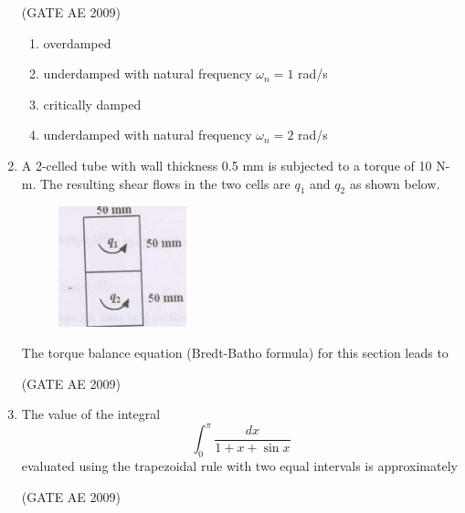 \documentclass[journal,12pt,onecolumn]{IEEEtran}
\theoremstyle{remark}
\begin{document}
\begin{flushleft}
\begin{enumerate}
\hfill(GATE AE 2009)

\begin{enumerate}
\item overdamped
\item underdamped with natural frequency $\omega_n = 1$ rad/s
\item critically damped
\item underdamped with natural frequency $\omega_n = 2$ rad/s
\end{enumerate}

\item A 2-celled tube with wall thickness 0.5 mm is subjected to a torque of 10 N-m. The resulting shear flows in the two cells are $q_1$ and $q_2$ as shown below.

\begin{figure}[H]
    \centering
    \includegraphics[width=0.35\columnwidth]{figs/44.png}
    \caption{}
    \label{fig:placeholder}
\end{figure}

The torque balance equation (Bredt-Batho formula) for this section leads to

\hfill(GATE AE 2009)

\begin{enumerate}

\end{enumerate}

\item The value of the integral
\[
\int_0^\pi \frac{dx}{1 + x + \sin x}
\]
evaluated using the trapezoidal rule with two equal intervals is approximately

\hfill(GATE AE 2009)

\begin{enumerate}


\end{enumerate}
\end{enumerate}
\end{flushleft}
\end{document}
